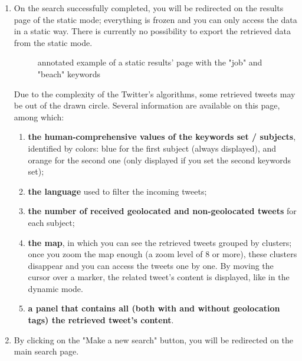 \documentclass[a4paper,11pt]{report}
\begin{document}
\begin{enumerate}
	\item On the search successfully  completed, you will be redirected on the results page of the static mode; everything is frozen and you can only access the data in a static way. There is currently no possibility to export the retrieved data from the static mode.
	\begin{figure}[H]
	\vspace{-5pt}
	\begin{center}
	\vspace{-5pt}
	\caption{annotated example of a static results' page with the "job" and "beach" keywords}
	\end{center}
	\end{figure}
	\vspace{-10pt}
	
	Due to the complexity of the Twitter's algorithms, some retrieved tweets may be out of the drawn circle. Several information are available on this page, among which:
	\begin{enumerate}
		\item \textbf{the human-comprehensive values of the keywords set / subjects}, identified by colors: blue for the first subject (always displayed), and orange for the second one (only displayed if you set the second keywords set);
		\item \textbf{the language} used to filter the incoming tweets;
		\item \textbf{the number of received geolocated and non-geolocated tweets} for each subject;
		\item \textbf{the map}, in which you can see the retrieved tweets grouped by clusters; once you zoom the map enough (a zoom level of 8 or more), these clusters disappear and you can access the tweets one by one. By moving the cursor over a marker, the related tweet's content is displayed, like in the dynamic mode.
		\item \textbf{a panel that contains all (both with and without geolocation tags) the retrieved tweet's content}.
	\end{enumerate}
	
	\item By clicking on the "Make a new search" button, you will be redirected on the main search page.
\end{enumerate}
\end{document}
